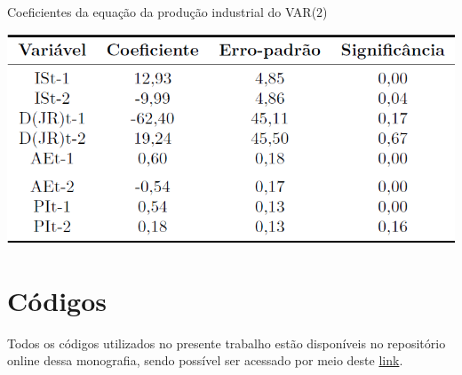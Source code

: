 \begin{apendicesenv}
\begin{table}[hbtp]
	\centering
	\caption{Coeficientes da equação da produção industrial do VAR($2$)} \label{table:coef_PI_var_2}
	\includegraphics[scale = 0.50]{figuras/coeficientes_PI_var_2.PNG}
\end{table}

\chapter{Códigos}

Todos os códigos utilizados no presente trabalho estão disponíveis no repositório online dessa monografia, sendo possível ser acessado por meio deste \href{https://github.com/cairebarletta/tcc}{link}.

\end{apendicesenv}
